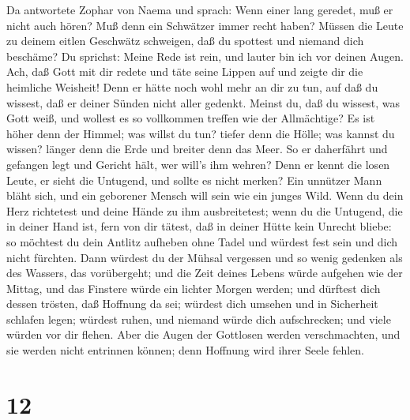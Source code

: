  Da antwortete Zophar von Naema und sprach: 
Wenn einer lang geredet, muß er nicht auch hören? Muß denn ein Schwätzer
immer recht haben?  Müssen die Leute zu deinem eitlen
Geschwätz schweigen, daß du spottest und niemand dich beschäme?
 Du sprichst: Meine Rede ist rein, und lauter bin ich vor
deinen Augen.  Ach, daß Gott mit dir redete und täte seine
Lippen auf  und zeigte dir die heimliche Weisheit! Denn er
hätte noch wohl mehr an dir zu tun, auf daß du wissest, daß er deiner
Sünden nicht aller gedenkt.  Meinst du, daß du wissest, was
Gott weiß, und wollest es so vollkommen treffen wie der Allmächtige?
 Es ist höher denn der Himmel; was willst du tun? tiefer
denn die Hölle; was kannst du wissen?  länger denn die Erde
und breiter denn das Meer.  So er daherfährt und gefangen
legt und Gericht hält, wer will's ihm wehren?  Denn er
kennt die losen Leute, er sieht die Untugend, und sollte es nicht
merken?  Ein unnützer Mann bläht sich, und ein geborener
Mensch will sein wie ein junges Wild.  Wenn du dein Herz
richtetest und deine Hände zu ihm ausbreitetest;  wenn du
die Untugend, die in deiner Hand ist, fern von dir tätest, daß in deiner
Hütte kein Unrecht bliebe:  so möchtest du dein Antlitz
aufheben ohne Tadel und würdest fest sein und dich nicht fürchten.
 Dann würdest du der Mühsal vergessen und so wenig gedenken
als des Wassers, das vorübergeht;  und die Zeit deines
Lebens würde aufgehen wie der Mittag, und das Finstere würde ein lichter
Morgen werden;  und dürftest dich dessen trösten, daß
Hoffnung da sei; würdest dich umsehen und in Sicherheit schlafen legen;
 würdest ruhen, und niemand würde dich aufschrecken; und
viele würden vor dir flehen.  Aber die Augen der Gottlosen
werden verschmachten, und sie werden nicht entrinnen können; denn
Hoffnung wird ihrer Seele fehlen.

\hypertarget{section-11}{%
\section{12}\label{section-11}}

